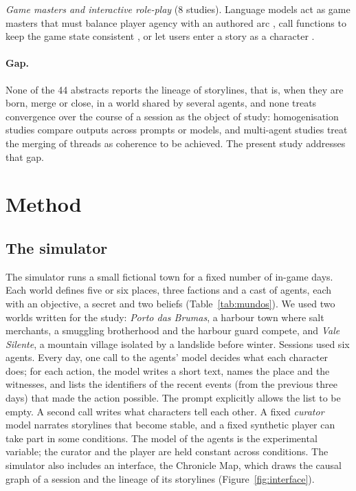 \documentclass[12pt]{article}
\begin{document}
\emph{Game masters and interactive role-play} (8 studies). Language models
act as game masters that must balance player agency with an authored arc
\parencite{revatr12}, call functions to keep the game state consistent
\parencite{revatr43}, or let users enter a story as a character
\parencite{revatr44}.

\paragraph{Gap.} None of the 44 abstracts reports the lineage of storylines,
that is, when they are born, merge or close, in a world shared by several
agents, and none treats convergence over the course of a session as the
object of study: homogenisation studies compare outputs across prompts or
models, and multi-agent studies treat the merging of threads as coherence to
be achieved. The present study addresses that gap.

\section{Method}

\subsection{The simulator}

The simulator runs a small fictional town for a fixed number of in-game
days. Each world defines five or six places, three factions and a
cast of agents, each with an objective, a secret and two beliefs
(Table~\ref{tab:mundos}). We used two worlds written for the study:
\emph{Porto das Brumas}, a harbour town where salt merchants, a smuggling
brotherhood and the harbour guard compete, and \emph{Vale Silente}, a
mountain village isolated by a landslide before winter. Sessions used six
agents. Every day, one call to the agents' model decides what each character
does; for each action, the model writes a short text, names the place and
the witnesses, and lists the identifiers of the recent events (from the
previous three days) that made the action possible. The prompt explicitly
allows the list to be empty. A second call writes what characters tell
each other. A fixed \emph{curator} model narrates storylines that become
stable, and a fixed synthetic player can take part in some conditions.
The model of the agents is the experimental variable; the curator and the
player are held constant across conditions. The simulator also includes an interface,
the Chronicle Map, which draws the causal graph of a session and the lineage
of its storylines (Figure~\ref{fig:interface}).
\end{document}
